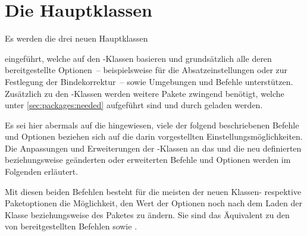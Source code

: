 \chapter[%
  Die Hauptklassen \Class*{tudscrbook}, \Class*{tudscrreprt} und
  \Class*{tudscrartcl}%
]{%
  Die Hauptklassen%
}
\begin{DeclareEntity*}{}
\begin{DeclareEntity*}{}
\begin{DeclareEntity*}{}
%
Es werden die drei neuen Hauptklassen
%
\begin{description}
\item {}
\item {}
\item {}
\end{description}
%
eingeführt, welche auf den \KOMAScript-Klassen basieren und grundsätzlich alle 
deren bereitgestellte Optionen~-- beispielsweise  für 
die Absatzeinstellungen oder  zur Festlegung der 
Bindekorrektur~-- sowie Umgebungen und Befehle unterstützen. Zusätzlich zu den 
\KOMAScript-Klassen werden weitere Pakete zwingend benötigt, welche unter 
\autoref{sec:packages:needed} aufgeführt sind und durch \TUDScript geladen 
werden.

Es sei hier abermals auf die  
hingewiesen, viele der folgend beschriebenen Befehle und Optionen beziehen sich 
auf die darin vorgestellten Einstellungsmöglichkeiten. Die Anpassungen und 
Erweiterungen der \KOMAScript-Klassen an das \CD und die neu definierten 
beziehungsweise geänderten oder erweiterten Befehle und Optionen werden im 
Folgenden erläutert.

\begin{Declaration}
  {}
\begin{Declaration}
  {}
Mit diesen beiden Befehlen besteht für die meisten der neuen Klassen- respektive
Paketoptionen die Möglichkeit, den Wert der Optionen noch nach dem Laden der 
Klasse beziehungsweise des Paketes zu ändern. Sie sind das Äquivalent zu den 
von \KOMAScript bereitgestellten Befehlen  sowie 
.


\end{Declaration}
\end{Declaration}
\end{DeclareEntity*}
\end{DeclareEntity*}
\end{DeclareEntity*}
